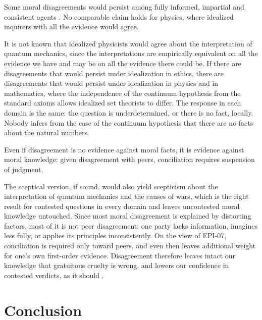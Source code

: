 \documentclass{situationist-preprint}
\begin{document}
\begin{objection}
Some moral disagreements would persist among fully informed, impartial and consistent agents \citep{DorisPlakias2008}. No comparable claim holds for physics, where idealized inquirers with all the evidence would agree.
\end{objection}

\begin{reply}
It is not known that idealized physicists would agree about the interpretation of quantum mechanics, since the interpretations are empirically equivalent on all the evidence we have and may be on all the evidence there could be. If there are disagreements that would persist under idealization in ethics, there are disagreements that would persist under idealization in physics and in mathematics, where the independence of the continuum hypothesis from the standard axioms allows idealized set theorists to differ. The response in each domain is the same: the question is underdetermined, or there is no fact, locally. Nobody infers from the case of the continuum hypothesis that there are no facts about the natural numbers.
\end{reply}

\begin{objection}
Even if disagreement is no evidence against moral facts, it is evidence against moral knowledge: given disagreement with peers, conciliation requires suspension of judgment.
\end{objection}

\begin{reply}
The sceptical version, if sound, would also yield scepticism about the interpretation of quantum mechanics and the causes of wars, which is the right result for contested questions in every domain and leaves uncontested moral knowledge untouched. Since most moral disagreement is explained by distorting factors, most of it is not peer disagreement: one party lacks information, imagines less fully, or applies its principles inconsistently. On the view of EPI-07, conciliation is required only toward peers, and even then leaves additional weight for one's own first-order evidence. Disagreement therefore leaves intact our knowledge that gratuitous cruelty is wrong, and lowers our confidence in contested verdicts, as it should \citep{McGrath2008,Vavova2014}.
\end{reply}

\section{Conclusion}
\end{document}
